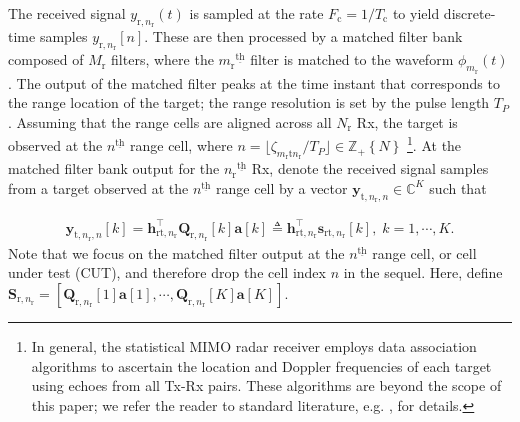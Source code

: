 \documentclass[9pt,journal]{IEEEtran}
\newcommand{\paren}[1]{\left({#1}\right)}
\newcommand{\bracket}[1]{{\left [{#1}\right ]}}
\newcommand{\braces}[1]{{\left\{ {#1}\right\}}}
\newcommand{\ith}[1]    {{#1}^{\underline{\text{th}}}}
\newcommand{\rr}{_\mathrm{r}}
\newcommand{\rnr}{_{\mathrm{r},n_\mathrm{r}}}
\newcommand{\target}{\mathrm{t}}
\newcommand{\sfrac}[2]{#1/#2}
\theoremstyle{definition}
\begin{document}
The received signal $y_{\mathrm{r},n\rr}(t)$ is sampled at the rate $F_\textrm{c}=1/T_\textrm{c}$ to yield discrete-time samples $y_{\mathrm{r},n\rr}\bracket{n}$. These are then processed by a matched filter bank composed of $M\rr$ filters, where the $\ith{m\rr}$ filter is matched to the waveform $\phi_{m_\mathrm{r}}(t)$ %
\cite{MCMIMO_Rad}. The output of the matched filter peaks at the time instant that corresponds to the range location of the target; the range resolution is set by the pulse length $T_\mathit{P}$ \cite{richards2010principles}. Assuming that the range cells are aligned \cite{mishra2019cognitive} across all $N\rr$ Rx, the target is observed at the $\ith{n}$ range cell, where $n=\lfloor \sfrac{\zeta_{m\rr \target n\rr}}{T_\mathit{P}}\rfloor\in\mathbb{Z}_+\braces{N}$ %
\footnote{In general, the statistical MIMO radar receiver employs data association algorithms to ascertain the location and Doppler frequencies of each target using echoes from all Tx-Rx pairs. These algorithms are beyond the scope of this paper; we refer the reader to standard literature, e.g. \cite{Nayebi13dataassociation}, for details. %
}. At the matched filter bank output for the $\ith{n\rr}$ Rx, denote the received signal samples from a target observed at the $\ith{n}$ range cell by a vector $\mathbf{y}_{\mathrm{t},n\rr,n}\in\mathbb{C}^{K}$ such that %
\par\noindent\small 
\begin{align}\label{radar range cell}
	\mathbf{y}_{\mathrm{t},n\rr,n}\bracket{k}=\mathbf{h}^\top_{\mathrm{rt},n\rr}\mathbf{Q}_{\mathrm{r,}n\rr}\bracket{k}\mathbf{a}\bracket{k}\triangleq\mathbf{h}^\top_{\mathrm{rt},n\rr}\mathbf{s}_{\mathrm{rt,}n\rr}\bracket{k},\; k =1,\cdots,K.
\end{align}\normalsize
Note that we focus on the matched filter output at the $\ith{n}$ range cell, or cell under test (CUT), and therefore drop the cell index $n$ in the sequel.  Here, define $\mathbf{S}\rnr=\bracket{\mathbf{Q}\rnr\bracket{1}\mathbf{a}\bracket{1},\cdots,\mathbf{Q}\rnr\bracket{K}\mathbf{a}\bracket{K}}$. 
\end{document}
